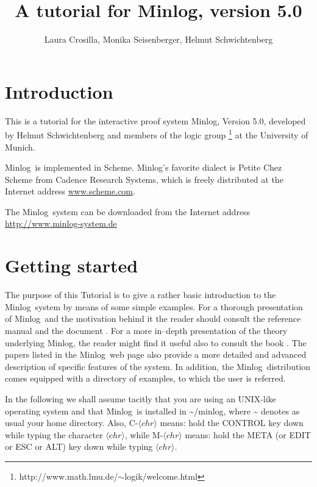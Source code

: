 \documentclass[12pt]{amsart}
\author[L. Crosilla, M. Seisenberger, H. Schwichtenberg]
{Laura Crosilla, Monika Seisenberger, Helmut Schwichtenberg}
\title[Minlog tutorial]{A tutorial for Minlog, version 5.0}
\newcommand{\mi}{Minlog}
\newcommand{\mdir}{\~{}/minlog}
\begin{document}
\maketitle

\section{Introduction}
This is a tutorial for the interactive proof system \mi, Version 5.0,
developed by Helmut Schwichtenberg and members of the logic group%
\footnote{http://www.math.lmu.de/$\sim$logik/welcome.html}
at the University of Munich.

\mi\ is implemented in Scheme.
\mi's favorite dialect is Petite Chez Scheme from Cadence Research Systems,
which is freely distributed at the Internet address \url{www.scheme.com}.

The \mi\ system can be downloaded from the Internet address
\url{http://www.minlog-system.de}


\section{Getting started}
The purpose of this Tutorial is to give a rather basic introduction to
the \mi\ system by means of some simple examples.  For a thorough
presentation of \mi\ and the motivation behind it the reader should
consult the reference manual \cite{minlogman} and the document
\cite{tcf}.  For a more in--depth presentation of the theory
underlying \mi, the reader might find it useful also to consult the
book \cite{SchwichtenbergWainer12}.  The papers listed in
the \mi\ web page also provide a more detailed and advanced
description of specific features of the system.  In addition, the \mi\
distribution comes equipped with a directory of examples, to which the
user is referred.

In the following we shall assume tacitly that you are using an
UNIX-like operating system and that \mi\ is installed in \mdir, where
\~{} denotes as usual your home directory.  Also, C-$\langle
chr\rangle$ means: hold the CONTROL key down while typing the
character $\langle chr \rangle$, while M-$\langle chr \rangle$ means:
hold the META (or EDIT or ESC or ALT) key down while typing $\langle
chr \rangle$.
\end{document}
